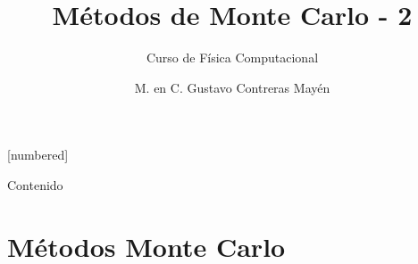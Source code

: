 



\normalfont
\usepackage{ccfonts}%
\usepackage[T1]{fontenc}%
\renewcommand{\rmdefault}{cmr}%
\linespread{1.3}
\title{Métodos de Monte Carlo - 2}
\subtitle{Curso de Física Computacional}
\author[]{M. en C. Gustavo Contreras Mayén}
[numbered]

\newcommand{\localtextbulletone}{\textcolor{gray}{\raisebox{.45ex}{\rule{.6ex}{.6ex}}}}
\maketitle
\fontsize{14}{14}\selectfont
{}
\begin{frame}{Contenido}
\tableofcontents[pausesections]
\end{frame}
\section{Métodos Monte Carlo}
